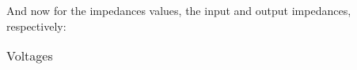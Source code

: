 And now for the impedances values, the input and output impedances, respectively:

\FloatBarrier
\begin{table}[h]
  \centering
  \begin{tabular}{|c|}
    \hline    
    
    \hline
  \end{tabular}
  \caption{Voltages}
  \label{tab:Spice1}
\end{table}
\FloatBarrier   

%    




